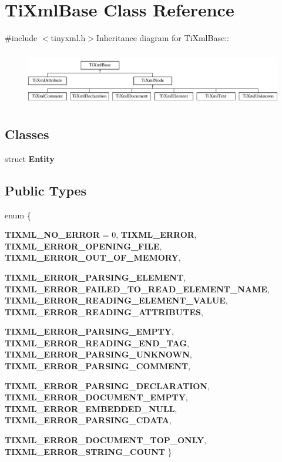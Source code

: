 \hypertarget{class_ti_xml_base}{
\section{TiXmlBase Class Reference}
\label{class_ti_xml_base}
}


{\ttfamily \#include $<$tinyxml.h$>$}Inheritance diagram for TiXmlBase::\begin{figure}[H]
\begin{center}
\leavevmode
\includegraphics[height=2.41379cm]{class_ti_xml_base}
\end{center}
\end{figure}
\subsection*{Classes}
\begin{DoxyCompactItemize}
\item 
struct {\bfseries Entity}
\end{DoxyCompactItemize}
\subsection*{Public Types}
\begin{DoxyCompactItemize}
\item 
enum \{ \par
{\bfseries TIXML\_\-NO\_\-ERROR} =  0, 
{\bfseries TIXML\_\-ERROR}, 
{\bfseries TIXML\_\-ERROR\_\-OPENING\_\-FILE}, 
{\bfseries TIXML\_\-ERROR\_\-OUT\_\-OF\_\-MEMORY}, 
\par
{\bfseries TIXML\_\-ERROR\_\-PARSING\_\-ELEMENT}, 
{\bfseries TIXML\_\-ERROR\_\-FAILED\_\-TO\_\-READ\_\-ELEMENT\_\-NAME}, 
{\bfseries TIXML\_\-ERROR\_\-READING\_\-ELEMENT\_\-VALUE}, 
{\bfseries TIXML\_\-ERROR\_\-READING\_\-ATTRIBUTES}, 
\par
{\bfseries TIXML\_\-ERROR\_\-PARSING\_\-EMPTY}, 
{\bfseries TIXML\_\-ERROR\_\-READING\_\-END\_\-TAG}, 
{\bfseries TIXML\_\-ERROR\_\-PARSING\_\-UNKNOWN}, 
{\bfseries TIXML\_\-ERROR\_\-PARSING\_\-COMMENT}, 
\par
{\bfseries TIXML\_\-ERROR\_\-PARSING\_\-DECLARATION}, 
{\bfseries TIXML\_\-ERROR\_\-DOCUMENT\_\-EMPTY}, 
{\bfseries TIXML\_\-ERROR\_\-EMBEDDED\_\-NULL}, 
{\bfseries TIXML\_\-ERROR\_\-PARSING\_\-CDATA}, 
\par
{\bfseries TIXML\_\-ERROR\_\-DOCUMENT\_\-TOP\_\-ONLY}, 
{\bfseries TIXML\_\-ERROR\_\-STRING\_\-COUNT}
 \}
\end{DoxyCompactItemize}
